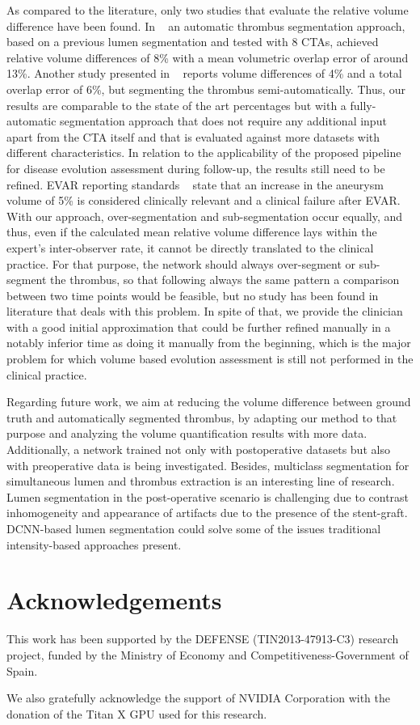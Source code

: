 \documentclass[preprint,authoryear,12pt]{elsarticle}
\begin{document}
As compared to the literature, only two studies that evaluate the relative volume difference have been found. In ~\citep{Mot10} an automatic thrombus segmentation approach, based on a previous lumen segmentation and tested with 8 CTAs, achieved relative volume differences of 8\% with a mean volumetric overlap error of around 13\%. Another study presented in ~\citep{Zoh12} reports volume differences of 4\% and a total overlap error of 6\%, but segmenting the thrombus semi-automatically. Thus, our results are comparable to the state of the art percentages but with a fully-automatic segmentation approach that does not require any additional input apart from the CTA itself and that is evaluated against more datasets with different characteristics. In relation to the applicability of the proposed pipeline for disease evolution assessment during follow-up, the results still need to be refined. EVAR reporting standards ~\citep{Cha02} state that an increase in the aneurysm volume of 5\% is considered clinically relevant and a clinical failure after EVAR. With our approach, over-segmentation and sub-segmentation occur equally, and thus, even if the calculated mean relative volume difference lays within the expert's inter-observer rate, it cannot be directly translated to the clinical practice. For that purpose, the network should always over-segment or sub-segment the thrombus, so that following always the same pattern a comparison between two time points would be feasible, but no study has been found in literature that deals with this problem. In spite of that, we provide the clinician with a good initial approximation that could be further refined manually in a notably inferior time as doing it manually from the beginning, which is the major problem for which volume based evolution assessment is still not performed in the clinical practice. 



Regarding future work, we aim at reducing the volume difference between ground truth and automatically segmented thrombus, by adapting our method to that purpose and analyzing the volume quantification results with more data. Additionally, a network trained not only with postoperative datasets but also with preoperative data is being investigated. Besides, multiclass segmentation for simultaneous lumen and thrombus extraction is an interesting line of research. Lumen segmentation in the post-operative scenario is challenging due to contrast inhomogeneity and appearance of artifacts due to the presence of the stent-graft. DCNN-based lumen segmentation could solve some of the issues traditional intensity-based approaches present.  

\section*{Acknowledgements}
This work has been supported by the DEFENSE (TIN2013-47913-C3) research project, funded by the Ministry of Economy and Competitiveness-Government of Spain.

We also gratefully acknowledge the support of NVIDIA Corporation with the donation of the Titan X GPU used for this research.



\end{document}
